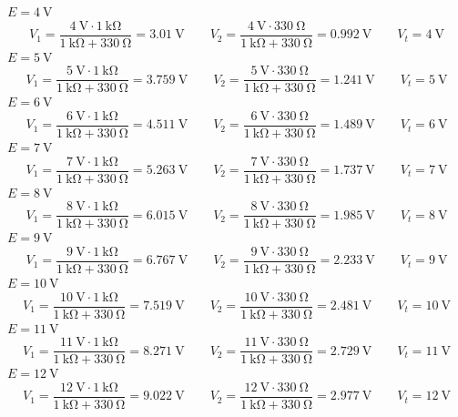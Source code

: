 \documentclass[a4paper]{article}
\begin{document}
$E=\SI{4}{\volt}$
\[V_1=\frac{\SI{4}{\volt}\cdot\SI{1}{\kilo\ohm}}{\SI{1}{\kilo\ohm}+\SI{330}{\ohm}}=\SI{3.01}{\volt}
\qquad
V_2=\frac{\SI{4}{\volt}\cdot\SI{330}{\ohm}}{\SI{1}{\kilo\ohm}+\SI{330}{\ohm}}=\SI{0.992}{\volt}
\qquad
V_{t}=\SI{4}{\volt}
\]
$E=\SI{5}{\volt}$
\[V_1=\frac{\SI{5}{\volt}\cdot\SI{1}{\kilo\ohm}}{\SI{1}{\kilo\ohm}+\SI{330}{\ohm}}=\SI{3.759}{\volt}
\qquad
V_2=\frac{\SI{5}{\volt}\cdot\SI{330}{\ohm}}{\SI{1}{\kilo\ohm}+\SI{330}{\ohm}}=\SI{1.241}{\volt}
\qquad
V_{t}=\SI{5}{\volt}\]
$E=\SI{6}{\volt}$
\[V_1=\frac{\SI{6}{\volt}\cdot\SI{1}{\kilo\ohm}}{\SI{1}{\kilo\ohm}+\SI{330}{\ohm}}=\SI{4.511}{\volt}
\qquad
V_2=\frac{\SI{6}{\volt}\cdot\SI{330}{\ohm}}{\SI{1}{\kilo\ohm}+\SI{330}{\ohm}}=\SI{1.489}{\volt}
\qquad
V_{t}=\SI{6}{\volt}
\]
$E=\SI{7}{\volt}$
\[V_1=\frac{\SI{7}{\volt}\cdot\SI{1}{\kilo\ohm}}{\SI{1}{\kilo\ohm}+\SI{330}{\ohm}}=\SI{5.263}{\volt}
\qquad
V_2=\frac{\SI{7}{\volt}\cdot\SI{330}{\ohm}}{\SI{1}{\kilo\ohm}+\SI{330}{\ohm}}=\SI{1.737}{\volt}
\qquad
V_{t}=\SI{7}{\volt}
\]
$E=\SI{8}{\volt}$
\[V_1=\frac{\SI{8}{\volt}\cdot\SI{1}{\kilo\ohm}}{\SI{1}{\kilo\ohm}+\SI{330}{\ohm}}=\SI{6.015}{\volt}
\qquad
V_2=\frac{\SI{8}{\volt}\cdot\SI{330}{\ohm}}{\SI{1}{\kilo\ohm}+\SI{330}{\ohm}}=\SI{1.985}{\volt}
\qquad
V_{t}=\SI{8}{\volt}
\]
$E=\SI{9}{\volt}$
\[V_1=\frac{\SI{9}{\volt}\cdot\SI{1}{\kilo\ohm}}{\SI{1}{\kilo\ohm}+\SI{330}{\ohm}}=\SI{6.767}{\volt}
\qquad
V_2=\frac{\SI{9}{\volt}\cdot\SI{330}{\ohm}}{\SI{1}{\kilo\ohm}+\SI{330}{\ohm}}=\SI{2.233}{\volt}
\qquad
V_{t}=\SI{9}{\volt}
\]
$E=\SI{10}{\volt}$
\[V_1=\frac{\SI{10}{\volt}\cdot\SI{1}{\kilo\ohm}}{\SI{1}{\kilo\ohm}+\SI{330}{\ohm}}=\SI{7.519}{\volt}
\qquad
V_2=\frac{\SI{10}{\volt}\cdot\SI{330}{\ohm}}{\SI{1}{\kilo\ohm}+\SI{330}{\ohm}}=\SI{2.481}{\volt}
\qquad
V_{t}=\SI{10}{\volt}
\]
$E=\SI{11}{\volt}$
\[V_1=\frac{\SI{11}{\volt}\cdot\SI{1}{\kilo\ohm}}{\SI{1}{\kilo\ohm}+\SI{330}{\ohm}}=\SI{8.271}{\volt}
\qquad
V_2=\frac{\SI{11}{\volt}\cdot\SI{330}{\ohm}}{\SI{1}{\kilo\ohm}+\SI{330}{\ohm}}=\SI{2.729}{\volt}
\qquad
V_{t}=\SI{11}{\volt}
\]
$E=\SI{12}{\volt}$
\[V_1=\frac{\SI{12}{\volt}\cdot\SI{1}{\kilo\ohm}}{\SI{1}{\kilo\ohm}+\SI{330}{\ohm}}=\SI{9.022}{\volt}
\qquad
V_2=\frac{\SI{12}{\volt}\cdot\SI{330}{\ohm}}{\SI{1}{\kilo\ohm}+\SI{330}{\ohm}}=\SI{2.977}{\volt}
\qquad
V_{t}=\SI{12}{\volt}
\]
\end{document}
